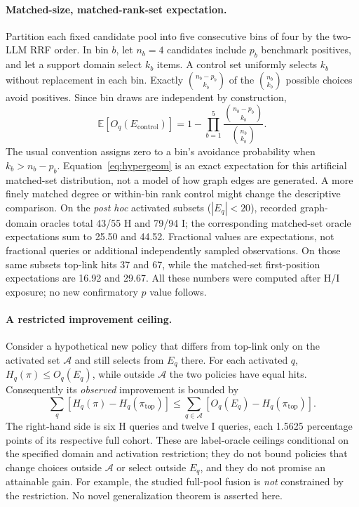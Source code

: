 \paragraph{Matched-size, matched-rank-set expectation.}
Partition each fixed candidate pool into five consecutive bins of four
by the two-LLM RRF order. In bin $b$, let $n_b=4$ candidates include
$p_b$ benchmark positives, and let a support domain select $k_b$ items.
A control set uniformly selects $k_b$ without replacement in each bin.
Exactly $\binom{n_b-p_b}{k_b}$ of the $\binom{n_b}{k_b}$ possible choices
avoid positives. Since bin draws are independent by construction,
\begin{equation}\label{eq:hypergeom}
 \mathbb E[O_q(E_{\mathrm{control}})]
 =1-\prod_{b=1}^{5}
   \frac{\binom{n_b-p_b}{k_b}}{\binom{n_b}{k_b}}.
\end{equation}
The usual convention assigns zero to a bin's avoidance probability when
$k_b>n_b-p_b$. Equation~\eqref{eq:hypergeom} is an exact expectation for
this artificial matched-set distribution, not a model of how graph edges
are generated. A more finely matched degree or within-bin rank control
might change the descriptive comparison. On the \emph{post hoc} activated
subsets ($|E_q|<20$), recorded graph-domain oracles total 43/55 H and
79/94 I; the corresponding matched-set oracle expectations sum to 25.50
and 44.52. Fractional values are expectations, not fractional queries or
additional independently sampled observations. On those same subsets
top-link hits 37 and 67, while the matched-set first-position expectations
are 16.92 and 29.67. All these numbers were computed after H/I exposure;
no new confirmatory $p$ value follows.

\paragraph{A restricted improvement ceiling.}
Consider a hypothetical new policy that differs from top-link only on
the activated set $\mathcal A$ and still selects from $E_q$ there. For
each activated $q$, $H_q(\pi)\le O_q(E_q)$, while outside $\mathcal A$
the two policies have equal hits. Consequently its \emph{observed}
improvement is bounded by
\begin{equation}
 \sum_q[H_q(\pi)-H_q(\pi_{\mathrm{top}})]
 \le\sum_{q\in\mathcal A}
 [O_q(E_q)-H_q(\pi_{\mathrm{top}})].
\end{equation}
The right-hand side is six H queries and twelve I queries, each 1.5625
percentage points of its respective full cohort. These are label-oracle
ceilings conditional on the specified domain and activation restriction;
they do not bound policies that change choices outside $\mathcal A$ or
select outside $E_q$, and they do not promise an attainable gain. For
example, the studied full-pool fusion is \emph{not} constrained by the
restriction. No novel generalization theorem is asserted here.